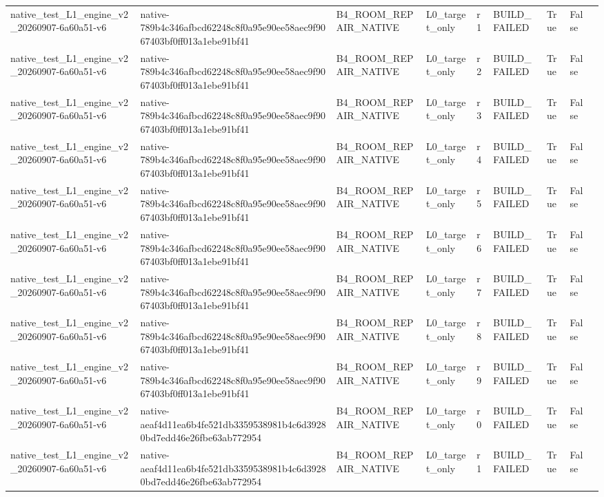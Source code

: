 \begin{tabular}{lllllllll}
native\_test\_L1\_engine\_v2\_20260907-6a60a51-v6 & native-789b4c346afbcd62248c8f0a95e90ee58aec9f9067403bf0ff013a1ebe91bf41 & B4\_ROOM\_REPAIR\_NATIVE & L0\_target\_only & r1 & BUILD\_FAILED & True & False &  \\
native\_test\_L1\_engine\_v2\_20260907-6a60a51-v6 & native-789b4c346afbcd62248c8f0a95e90ee58aec9f9067403bf0ff013a1ebe91bf41 & B4\_ROOM\_REPAIR\_NATIVE & L0\_target\_only & r2 & BUILD\_FAILED & True & False &  \\
native\_test\_L1\_engine\_v2\_20260907-6a60a51-v6 & native-789b4c346afbcd62248c8f0a95e90ee58aec9f9067403bf0ff013a1ebe91bf41 & B4\_ROOM\_REPAIR\_NATIVE & L0\_target\_only & r3 & BUILD\_FAILED & True & False &  \\
native\_test\_L1\_engine\_v2\_20260907-6a60a51-v6 & native-789b4c346afbcd62248c8f0a95e90ee58aec9f9067403bf0ff013a1ebe91bf41 & B4\_ROOM\_REPAIR\_NATIVE & L0\_target\_only & r4 & BUILD\_FAILED & True & False &  \\
native\_test\_L1\_engine\_v2\_20260907-6a60a51-v6 & native-789b4c346afbcd62248c8f0a95e90ee58aec9f9067403bf0ff013a1ebe91bf41 & B4\_ROOM\_REPAIR\_NATIVE & L0\_target\_only & r5 & BUILD\_FAILED & True & False &  \\
native\_test\_L1\_engine\_v2\_20260907-6a60a51-v6 & native-789b4c346afbcd62248c8f0a95e90ee58aec9f9067403bf0ff013a1ebe91bf41 & B4\_ROOM\_REPAIR\_NATIVE & L0\_target\_only & r6 & BUILD\_FAILED & True & False &  \\
native\_test\_L1\_engine\_v2\_20260907-6a60a51-v6 & native-789b4c346afbcd62248c8f0a95e90ee58aec9f9067403bf0ff013a1ebe91bf41 & B4\_ROOM\_REPAIR\_NATIVE & L0\_target\_only & r7 & BUILD\_FAILED & True & False &  \\
native\_test\_L1\_engine\_v2\_20260907-6a60a51-v6 & native-789b4c346afbcd62248c8f0a95e90ee58aec9f9067403bf0ff013a1ebe91bf41 & B4\_ROOM\_REPAIR\_NATIVE & L0\_target\_only & r8 & BUILD\_FAILED & True & False &  \\
native\_test\_L1\_engine\_v2\_20260907-6a60a51-v6 & native-789b4c346afbcd62248c8f0a95e90ee58aec9f9067403bf0ff013a1ebe91bf41 & B4\_ROOM\_REPAIR\_NATIVE & L0\_target\_only & r9 & BUILD\_FAILED & True & False &  \\
native\_test\_L1\_engine\_v2\_20260907-6a60a51-v6 & native-aeaf4d11ea6b4fe521db3359538981b4c6d39280bd7edd46e26fbe63ab772954 & B4\_ROOM\_REPAIR\_NATIVE & L0\_target\_only & r0 & BUILD\_FAILED & True & False &  \\
native\_test\_L1\_engine\_v2\_20260907-6a60a51-v6 & native-aeaf4d11ea6b4fe521db3359538981b4c6d39280bd7edd46e26fbe63ab772954 & B4\_ROOM\_REPAIR\_NATIVE & L0\_target\_only & r1 & BUILD\_FAILED & True & False &  \\

\end{tabular}
